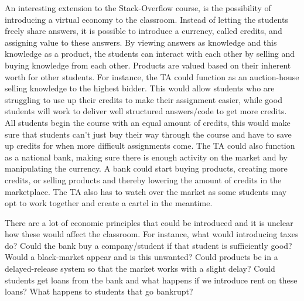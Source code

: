 \documentclass[11pt]{article}
\begin{document}
An interesting extension to the Stack-Overflow course, is the possibility of introducing a virtual economy to the classroom. Instead of letting the students freely share answers, it is possible to introduce a currency, called credits, and assigning value to these answers. By viewing answers as knowledge and this knowledge as a product, the students can interact with each other by selling and buying knowledge from each other. Products are valued based on their inherent worth for other students. For instance, the TA could function as an auction-house selling knowledge to the highest bidder. This would allow students who are struggling to use up their credits to make their assignment easier, while good students will work to deliver well structured answers/code to get more credits. All students begin the course with an equal amount of credits, this would make sure that students can’t just buy their way through the course and have to save up credits for when more difficult assignments come. The TA could also 
function as a national bank, making sure there is enough activity on the market and by manipulating the currency. A bank could start buying products, creating more credits, or selling products and thereby lowering the amount of credits in the marketplace. The TA also has to watch over the market as some students may opt to work together and create a cartel in the meantime. 

There are a lot of economic principles that could be introduced and it is unclear how these would affect the classroom. For instance, what would introducing taxes do? Could the bank buy a company/student if that student is sufficiently good? Would a black-market appear and is this unwanted? Could products be in a delayed-release system so that the market works with a slight delay? Could students get loans from the bank and what happens if we introduce rent on these loans? What happens to students that go bankrupt? 
\end{document}
